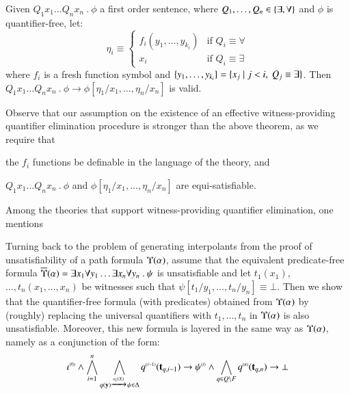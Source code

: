 \documentclass{llncs}
\begin{document}
\begin{theorem}\label{thm:skolem}
  Given $Q_1 x_1 \ldots Q_n x_n ~.~ \phi$ a first order sentence, 
  where $Q_1, \ldots, Q_n \in \{ \exists,\forall \}$ and $\phi$ is
  quantifier-free, let: 
  \[\eta_i \equiv \left\{\begin{array}{ll}
  f_i(y_1,\ldots,y_{k_i}) & \text{if } Q_i \equiv \forall \\
  x_i & \text{if } Q_i \equiv \exists
  \end{array}\right.\]
  where $f_i$ is a fresh function symbol and $\{ y_1, \ldots,
    y_{k_i} \} = \{ x_j \mid j < i,~ Q_j \equiv \exists \}$. Then \(Q_1
  x_1 \ldots Q_n x_n ~.~ \phi \rightarrow
  \phi[\eta_1/x_1,\ldots,\eta_n/x_n]\) is valid.
\end{theorem}
Observe that our assumption on the existence of an effective
witness-providing quantifier elimination procedure is stronger than
the above theorem, as we require that \begin{inparaenum}[(i)] 
\item the $f_i$ functions be definable in the language of the theory,
  and 
\item $Q_1 x_1 \ldots Q_n x_n ~.~ \phi$ and
  $\phi[\eta_1/x_1,\ldots,\eta_n/x_n]$ are equi-satisfiable. 
\end{inparaenum}
Among the theories that support witness-providing quantifier
elimination, one mentions 

Turning back to the problem of generating interpolants from the proof
of unsatisfiability of a path formula $\Upsilon({\alpha})$, assume that
the equivalent predicate-free formula $\overline{\Upsilon}({\alpha}) = \exists
x_1 \forall y_1 \ldots \exists x_n \forall y_n ~.~ \psi$ is
unsatisfiable and let $t_1(x_1)$, $\ldots, t_n(x_1,\ldots,x_n)$ be
witnesses such that $\psi[t_1/y_1,\ldots,t_n/y_n] \equiv \bot$. Then
we show that the quantifier-free formula (with predicates) obtained
from $\Upsilon({\alpha})$ by (roughly) replacing the universal
quantifiers with $t_1, \ldots, t_n$ in $\Upsilon({\alpha})$ is also
unsatisfiable.  Moreover, this new formula is layered in the same way
as $\Upsilon({\alpha})$, namely as a conjunction of the form:
\[{\iota}^{\scriptscriptstyle{({0})}} \wedge \bigwedge_{i=1}^n \bigwedge_{q(\mathbf y)
  \xrightarrow{{\scriptscriptstyle a_i(X)}}_{{\scriptstyle }} \psi \in \Delta} {q}^{\scriptscriptstyle{({i-1})}}(\mathbf t_{q,i-1})
\rightarrow {\psi}^{\scriptscriptstyle{({i})}} \wedge \bigwedge_{q \in Q \setminus F}
{q}^{\scriptscriptstyle{({n})}}(\mathbf t_{q,n}) \rightarrow \bot\]
\end{document}
